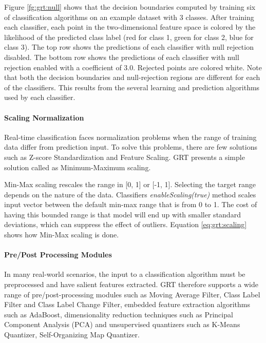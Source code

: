 Figure \ref{fg:grt:null} shows that the decision boundaries computed by training six of classification algorithms on an example dataset with 3 classes. After training each classifier, each point in the two-dimensional feature space is colored by the likelihood of the predicted class label (red for class 1, green for class 2, blue for class 3). The top row shows the predictions of each classifier with null rejection disabled. The bottom row shows the predictions of each classifier with null rejection enabled with a coefficient of 3.0. Rejected points are colored white. Note that both the decision boundaries and null-rejection regions are different for each of the classifiers. This results from the several learning and prediction algorithms used by each classifier. 

\paragraph*{Scaling Normalization} Real-time classification faces normalization problems when the range of training data differ from prediction input. To solve this problems, there are few solutions such as Z-score Standardization and Feature Scaling. GRT presents a simple solution called as Minimum-Maximum scaling.

Min-Max scaling rescales the range in [0, 1] or [-1, 1]. Selecting the target range depends on the nature of the data. Classifiers \textit{enableScaling(true)} method scales input vector between the default min-max range that is from 0 to 1. The cost of having this bounded range is that model will end up with smaller standard deviations, which can suppress the effect of outliers. Equation \ref{eq:grt:scaling} shows how Min-Max scaling is done.



\paragraph*{Pre/Post Processing Modules} In many real-world scenarios, the input to a classification algorithm must be preprocessed and have salient features extracted. GRT therefore supports a wide range of pre/post-processing modules such as Moving Average Filter, Class Label Filter and Class Label Change Filter, embedded feature extraction algorithms such as AdaBoost, dimensionality reduction techniques such as Principal Component Analysis (PCA) and unsupervised quantizers such as K-Means Quantizer, Self-Organizing Map Quantizer.

